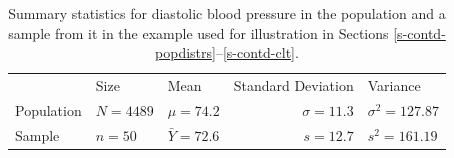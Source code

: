 \documentclass[11pt,a4paper,openany]{book}
\begin{document}
\begin{longtable}[]{@{}lllrl@{}}
\caption{\label{tab:t-bp-example} Summary statistics for diastolic blood
pressure in the population and a sample from it in the example used for
illustration in Sections
\ref{s-contd-popdistrs}--\ref{s-contd-clt}.}\tabularnewline
\toprule
\begin{minipage}[t]{0.14\columnwidth}\raggedright\strut
\strut
\end{minipage} & \begin{minipage}[t]{0.12\columnwidth}\raggedright\strut
Size\strut
\end{minipage} & \begin{minipage}[t]{0.18\columnwidth}\raggedright\strut
Mean\strut
\end{minipage} & \begin{minipage}[t]{0.17\columnwidth}\raggedleft\strut
Standard Deviation\strut
\end{minipage} & \begin{minipage}[t]{0.23\columnwidth}\raggedright\strut
Variance\strut
\end{minipage}\tabularnewline
\begin{minipage}[t]{0.14\columnwidth}\raggedright\strut
Population\strut
\end{minipage} & \begin{minipage}[t]{0.12\columnwidth}\raggedright\strut
\(N=4489\)\strut
\end{minipage} & \begin{minipage}[t]{0.18\columnwidth}\raggedright\strut
\(\mu=74.2\)\strut
\end{minipage} & \begin{minipage}[t]{0.17\columnwidth}\raggedleft\strut
\(\sigma=11.3\)\strut
\end{minipage} & \begin{minipage}[t]{0.23\columnwidth}\raggedright\strut
\(\sigma^{2}=127.87\)\strut
\end{minipage}\tabularnewline
\begin{minipage}[t]{0.14\columnwidth}\raggedright\strut
Sample\strut
\end{minipage} & \begin{minipage}[t]{0.12\columnwidth}\raggedright\strut
\(n=50\)\strut
\end{minipage} & \begin{minipage}[t]{0.18\columnwidth}\raggedright\strut
\(\bar{Y}=72.6\)\strut
\end{minipage} & \begin{minipage}[t]{0.17\columnwidth}\raggedleft\strut
\(s=12.7\)\strut
\end{minipage} & \begin{minipage}[t]{0.23\columnwidth}\raggedright\strut
\(s^{2}=161.19\)\strut
\end{minipage}\tabularnewline
\bottomrule
\end{longtable}
\end{document}
